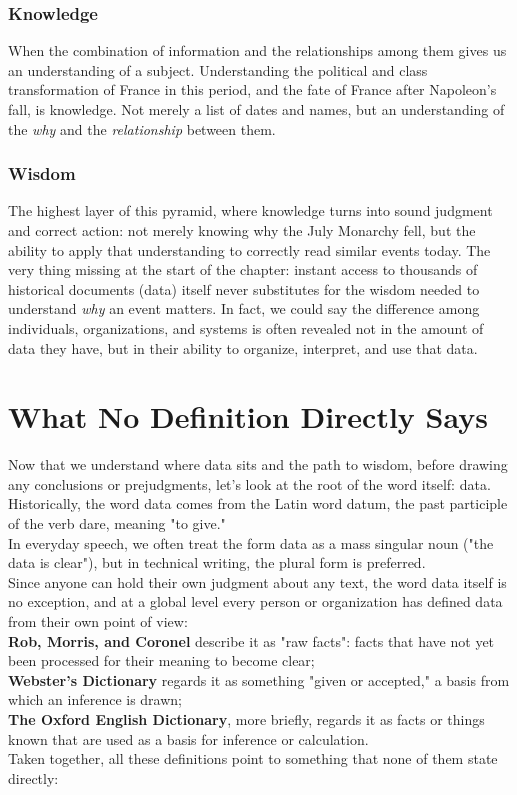 \subsubsection{Knowledge}
When the combination of information and the relationships among them gives us an understanding of a subject. Understanding the political and class transformation of France in this period, and the fate of France after Napoleon's fall, is knowledge. Not merely a list of dates and names, but an understanding of the \emph{why} and the \emph{relationship} between them.

\subsubsection{Wisdom}
The highest layer of this pyramid, where knowledge turns into sound judgment and correct action: not merely knowing why the July Monarchy fell, but the ability to apply that understanding to correctly read similar events today. The very thing missing at the start of the chapter: instant access to thousands of historical documents (data) itself never substitutes for the wisdom needed to understand \emph{why} an event matters. In fact, we could say the difference among individuals, organizations, and systems is often revealed not in the amount of data they have, but in their ability to organize, interpret, and use that data.
\newpage
\section{What No Definition Directly Says}
\label{sec:what-no-definition-says}

Now that we understand where data sits and the path to wisdom, before drawing any conclusions or prejudgments, let's look at the root of the word itself: data.\\
Historically, the word data comes from the Latin word datum, the past participle of the verb dare, meaning "to give."\\
In everyday speech, we often treat the form data as a mass singular noun ("the data is clear"), but in technical writing, the plural form is preferred.\\
Since anyone can hold their own judgment about any text, the word data itself is no exception, and at a global level every person or organization has defined data from their own point of view\autocite{floridi2010,zins2007}:\\
\textbf{Rob, Morris, and Coronel} describe it as "raw facts": facts that have not yet been processed for their meaning to become clear\autocite{rob2013};\\
\textbf{Webster's Dictionary} regards it as something "given or accepted," a basis from which an inference is drawn\autocite{websters1934};\\
\textbf{The Oxford English Dictionary}, more briefly, regards it as facts or things known that are used as a basis for inference or calculation\autocite{oed2023}.\\
\newpage
Taken together, all these definitions point to something that none of them state directly:

